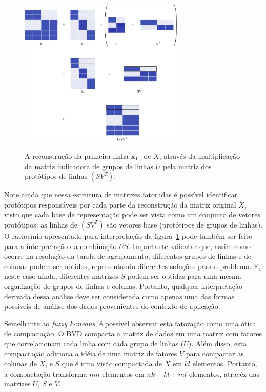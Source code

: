 \documentclass[
    12pt,                %
    oneside,            %
    a4paper,            %
    english,            %
    brazil                %
    ]{abntex2ppgsi}
\begin{document}
\begin{figure}[H]
\centering
\caption{
A reconstrução da primeira linha $\mathbf{x}_{1 \cdot}$ de $X$, através da multiplicação da matriz indicadora de grupos de linhas $U$ pela matriz dos protótipos de linhas $(S V^T)$. %
}
\includegraphics[width=0.7\textwidth]{img/reconstruction.png}
\label{fig:bvd:reconstruction}
\end{figure}

Note ainda que nessa estrutura de matrizes fatoradas é possível identificar protótipos responsáveis por cada parte da reconstrução da matriz original $X$, visto que cada base de representação pode ser vista como um conjunto de vetores protótipos: as linhas de $(SV^T)$ são vetores base (protótipos de grupos de linhas).
O raciocínio apresentado para interpretação da figura~\ref{fig:bvd:reconstruction} pode também ser feito para a interpretação da combinação $US$.
Importante salientar que, assim como ocorre na resolução da tarefa de agrupamento, diferentes grupos de linhas e de colunas podem ser obtidos, representando diferentes soluções para o problema.
E, neste caso ainda, diferentes matrizes $S$ podem ser obtidas para uma mesma organização de grupos de linhas e colunas.
Portanto, qualquer interpretação derivada dessa análise deve ser considerada como apenas uma das formas possíveis de análise dos dados provenientes do contexto de aplicação.

Semelhante ao \textit{fuzzy k-means}, é possível observar esta fatoração como uma ótica de compactação.
O BVD compacta a matriz de dados em uma matriz com fatores que correlacionam cada linha com cada grupo de linhas ($U$).
Além disso, esta compactação adiciona a idéia de uma matriz de fatores $V$ para compactar as colunas de $X$, e $S$ que é uma visão compactada de $X$ em $kl$ elementos.
Portanto, a compactação transforma $nm$ elementos em $nk + kl + ml$ elementos, atravéz das matrizes $U$, $S$ e $V$.
\end{document}
